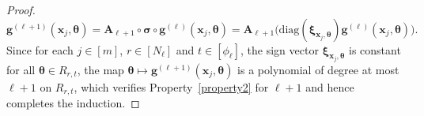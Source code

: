 \documentclass[12pt]{article}
\begin{document}
\begin{proof}
    \[  
    \bm g^{(\ell+1)}(\bm x_j,\bm \theta) = \bm A_{\ell+1}\circ\bm \sigma\circ \bm g^{(\ell)}(\bm x_j,\bm \theta) = \bm A_{\ell+1}\bigl(\mathrm{diag}(\bm \xi_{\bm x_j,\bm \theta}) \bm g^{(\ell)}(\bm x_j,\bm \theta) \bigr).
    \]
    Since for each $j\in[m]$, $r\in[N_\ell]$ and $t\in[\phi_{\ell}]$, the sign vector $\bm \xi_{\bm x_j,\bm \theta}$ is constant for all $\bm \theta\in R_{r,t}$, the map $\bm \theta\mapsto \bm g^{(\ell+1)}(\bm x_j,\bm \theta)$ is a polynomial of degree at most $\ell+1$ on $R_{r,t}$, which verifies Property~\ref{property2} for $\ell+1$ and hence completes the induction.
    


\end{proof}
\end{document}
